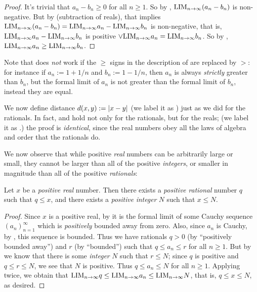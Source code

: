 \begin{proof}
It's trivial that \(a_n - b_n \ge 0\) for all \(n \ge 1\).
So by , \(\text{LIM}_{n \to \infty} (a_n - b_n)\) is non-negative.
But by  (subtraction of reals), that implies \(\text{LIM}_{n \to \infty} (a_n - b_n) = \text{LIM}_{n \to \infty} a_n - \text{LIM}_{n \to \infty} b_n\) is non-negative, that is, \(\text{LIM}_{n \to \infty} a_n - \text{LIM}_{n \to \infty} b_n\) is positive \(\lor \text{LIM}_{n \to \infty} a_n = \text{LIM}_{n \to \infty} b_n\).
So by , \(\text{LIM}_{n \to \infty} a_n \ge \text{LIM}_{n \to \infty} b_n\).
\end{proof}

\begin{remark} \label{remark 5.4.11}
Note that  does \emph{not} work if the \(\ge\) signs in the description of  are replaced by \(>\):
for instance if \(a_n := 1 + 1 / n\) and \(b_n := 1 - 1/n\), then \(a_n\) is always \emph{strictly} greater than \(b_n\), but the formal limit of \(a_n\) is not greater than the formal limit of \(b_n\), instead they are equal.
\end{remark}

\begin{note}
We now define distance \(d(x, y) := \lvert x - y\rvert\) (we label it as ) just as we did for the rationals.
In fact,  and  hold not only for the rationals, but for the reals; (we label it as .)
the proof is \emph{identical}, since the real numbers obey all the laws of algebra and order that the rationals do.
\end{note}

We now observe that while positive \emph{real} numbers can be arbitrarily large or small,
they cannot be larger than all of the positive \emph{integers}, 
or smaller in magnitude than all of the positive \emph{rationals}:
\begin{proposition}  \label{prop 5.4.12}
Let \(x\) be a \emph{positive real} number.
Then there exists a \emph{positive rational} number \(q\) such that \(q \le x\),
and there exists a \emph{positive integer} \(N\) such that \(x \le N\).
\end{proposition}

\begin{proof}
Since \(x\) is a positive real, by  it is the formal limit of some Cauchy sequence \((a_n)_{n = 1}^{\infty}\) which is \emph{positively} bounded away from zero.
Also, since \(a_n\) is Cauchy, by , this sequence is bounded.
Thus we have rationals \(q > 0\) (by ``positively bounded away'') and \(r\) (by ``bounded'') such that \(q \le a_n \le r\) for all \(n \ge 1\).
But by  we know that there is some \emph{integer} \(N\) such that \(r \le N\);
since \(q\) is positive and \(q \le r \le N\), we see that \(N\) is positive.
Thus \(q \le a_n \le N\) for all \(n \ge 1\).
Applying  twice, we obtain that \(\text{LIM}_{n \to \infty} q \le \text{LIM}_{n \to \infty} a_n \le \text{LIM}_{n \to \infty} N\), that is, \(q \le x \le N\), as desired.
\end{proof}

